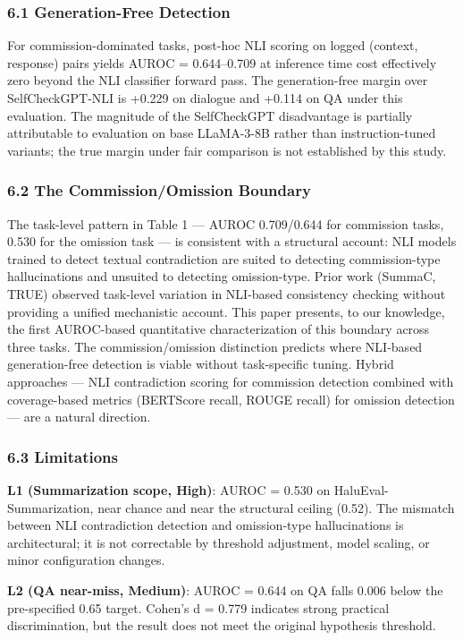 
\subsubsection{6.1 Generation-Free Detection}

For commission-dominated tasks, post-hoc NLI scoring on logged (context, response) pairs yields AUROC = 0.644--0.709 at inference time cost effectively zero beyond the NLI classifier forward pass. The generation-free margin over SelfCheckGPT-NLI is +0.229 on dialogue and +0.114 on QA under this evaluation. The magnitude of the SelfCheckGPT disadvantage is partially attributable to evaluation on base LLaMA-3-8B rather than instruction-tuned variants; the true margin under fair comparison is not established by this study.

\subsubsection{6.2 The Commission/Omission Boundary}

The task-level pattern in Table 1 --- AUROC 0.709/0.644 for commission tasks, 0.530 for the omission task --- is consistent with a structural account: NLI models trained to detect textual contradiction are suited to detecting commission-type hallucinations and unsuited to detecting omission-type. Prior work (SummaC, TRUE) observed task-level variation in NLI-based consistency checking without providing a unified mechanistic account. This paper presents, to our knowledge, the first AUROC-based quantitative characterization of this boundary across three tasks. The commission/omission distinction predicts where NLI-based generation-free detection is viable without task-specific tuning. Hybrid approaches --- NLI contradiction scoring for commission detection combined with coverage-based metrics (BERTScore recall, ROUGE recall) for omission detection --- are a natural direction.

\subsubsection{6.3 Limitations}

\textbf{L1 (Summarization scope, High)}: AUROC = 0.530 on HaluEval-Summarization, near chance and near the structural ceiling (0.52). The mismatch between NLI contradiction detection and omission-type hallucinations is architectural; it is not correctable by threshold adjustment, model scaling, or minor configuration changes.

\textbf{L2 (QA near-miss, Medium)}: AUROC = 0.644 on QA falls 0.006 below the pre-specified 0.65 target. Cohen's d = 0.779 indicates strong practical discrimination, but the result does not meet the original hypothesis threshold.

